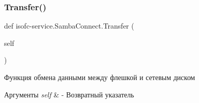 \subsubsection{\texorpdfstring{Transfer()}{Transfer()}}
{\footnotesize\ttfamily def isofc-\/service.\+Samba\+Connect.\+Transfer (\begin{DoxyParamCaption}\item[{}]{self }\end{DoxyParamCaption})}



Функция обмена данными между флешкой и сетевым диском 


\begin{DoxyParams}{Аргументы}
{\em self} & -\/ Возвратный указатель \\
\hline
\end{DoxyParams}

